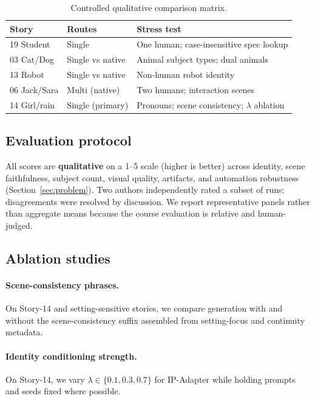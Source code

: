 \begin{table}[!t]
  \centering
  \small
  \caption{Controlled qualitative comparison matrix.}
  \label{tab:controlled_comparisons}
  \begin{tabular}{p{}p{}p{}}
    \toprule
    \textbf{Story} & \textbf{Routes} & \textbf{Stress test} \\
    \midrule
    19 Student & Single & One human; case-insensitive spec lookup \\
    03 Cat/Dog & Single vs native & Animal subject types; dual animals \\
    13 Robot & Single vs native & Non-human robot identity \\
    06 Jack/Sara & Multi (native) & Two humans; interaction scenes \\
    14 Girl/rain & Single (primary) & Pronouns; scene consistency; $\lambda$ ablation \\
  \end{tabular}
\end{table}

\subsection{Evaluation protocol}
All scores are \textbf{qualitative} on a 1--5 scale (higher is better) across identity, scene faithfulness, subject count, visual quality, artifacts, and automation robustness (Section~\ref{sec:problem}).
Two authors independently rated a subset of runs; disagreements were resolved by discussion.
We report representative panels rather than aggregate means because the course evaluation is relative and human-judged.

\subsection{Ablation studies}
\label{sec:ablations}

\paragraph{Scene-consistency phrases.}
On Story-14 and setting-sensitive stories, we compare generation with and without the scene-consistency suffix assembled from setting-focus and continuity metadata.

\paragraph{Identity conditioning strength.}
On Story-14, we vary $\lambda \in \{0.1, 0.3, 0.7\}$ for IP-Adapter while holding prompts and seeds fixed where possible.

